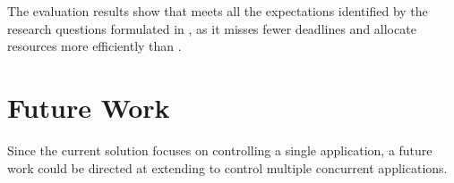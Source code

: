 The evaluation results show that \tool meets all the expectations identified by the research questions formulated in , as it misses fewer deadlines and allocate resources more efficiently than \cSpark. 

\section{Future Work}\label{sec:future_work}
 
Since the current solution focuses on controlling a single application, a future work could be directed at extending \tool to control multiple concurrent applications.

